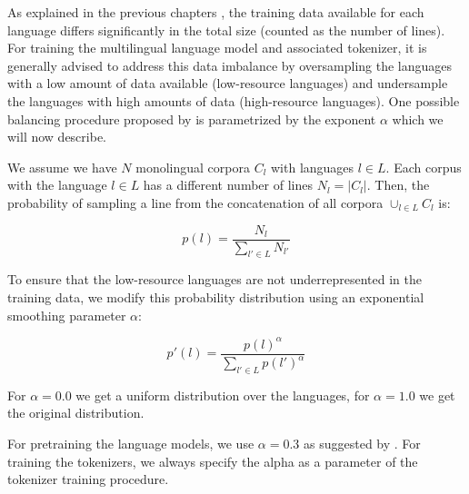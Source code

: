 
As explained in the previous chapters , the training data available for each language differs significantly in the total size (counted as the number of lines). For training the multilingual language model and associated tokenizer, it is generally advised to address this data imbalance by oversampling the languages with a low amount of data available (low-resource languages) and undersample the languages with high amounts of data (high-resource languages). One possible balancing procedure proposed by \citet{devlin_bert_2019,conneau_unsupervised_2020} is parametrized by the exponent $\alpha$ which we will now describe.

We assume we have $N$ monolingual corpora $C_l$ with languages $l \in L$. Each corpus with the language $l \in L$ has a different number of lines $N_l = |C_l|$. Then, the probability of sampling a line from the concatenation of all corpora $\cup_{l \in L} C_l$ is:

\begin{equation}
    p(l) = \frac{N_l}{\sum_{l' \in L} N_{l'}}
\end{equation}


To ensure that the low-resource languages are not underrepresented in the training data, we modify this probability distribution using an exponential smoothing parameter $\alpha$:

\begin{equation}
    p'(l) = \frac{p(l)^\alpha}{\sum_{l' \in L} p(l')^\alpha}
\end{equation}

For $\alpha = 0.0$ we get a uniform distribution over the languages, for $\alpha = 1.0$ we get the original distribution. 

For pretraining the language models, we use $\alpha = 0.3$ as suggested by \citet{conneau_unsupervised_2020-1}. For training the tokenizers, we always specify the alpha as a parameter of the tokenizer training procedure. 

